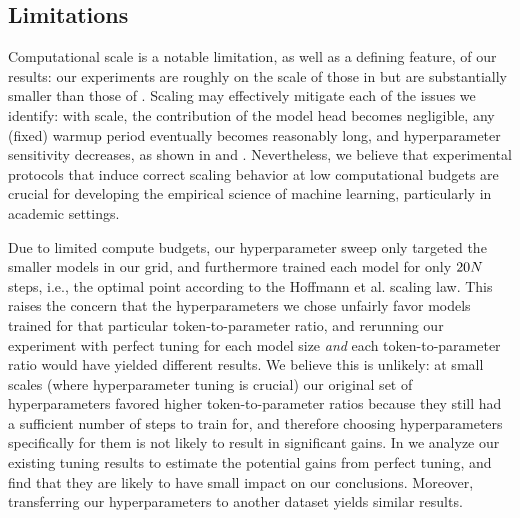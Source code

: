 \documentclass{article}
\makeatletter
\theoremstyle{plain}
\theoremstyle{definition}
\theoremstyle{remark}
\newcommand{\maybeSubscript}[1]{
  \ifthenelse{\equal{#1}{}}{}{_{#1}}%
}
\newcommand{\Hoffmann}{Hoffmann et al.\@\xspace}
\newcommand{\params}[1][]{N\maybeSubscript{#1}}
\makeatother
\begin{document}
%
\subsection{Limitations}\label{subsec:limitations}

Computational scale is a notable limitation, as well as a defining feature, of our results: our experiments are roughly on the scale of those in \citet{kaplan2020scaling} but are substantially smaller than those of \citet{hoffmann2022empirical}. Scaling may effectively mitigate each of the issues we identify: with scale, the contribution of the model head becomes negligible, any (fixed) warmup period eventually becomes reasonably long, and hyperparameter sensitivity decreases, as shown in  and . Nevertheless, we believe that experimental protocols that induce correct scaling behavior at low computational budgets are crucial for developing the empirical science of machine learning, particularly in academic settings. 

Due to limited compute budgets, our hyperparameter sweep only targeted the smaller models in our grid, and furthermore trained each model for only $20\params$ steps, i.e., the optimal point according to the \Hoffmann scaling law. This raises the concern that the hyperparameters we chose unfairly favor models trained for that particular token-to-parameter ratio, and rerunning our experiment with perfect tuning for each model size \emph{and} each token-to-parameter ratio would have yielded different results. We believe this is unlikely: at small scales (where hyperparameter tuning is crucial) our original set of hyperparameters favored higher token-to-parameter ratios because they still had a sufficient number of steps to train for, and therefore choosing hyperparameters specifically for them is not likely to result in significant gains. In  we analyze our existing tuning results to estimate the potential gains from perfect tuning, and find that they are likely to have small impact on our conclusions. Moreover, transferring our hyperparameters to another dataset yields similar results.
%
\end{document}
